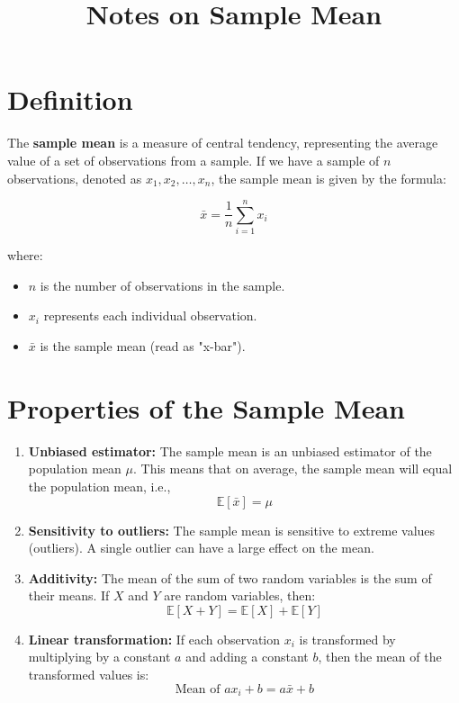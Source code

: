 \documentclass{article}
\title{Notes on Sample Mean}
\author{}
\date{}
\begin{document}
\maketitle

\section*{Definition}

The \textbf{sample mean} is a measure of central tendency, representing the average value of a set of observations from a sample. If we have a sample of $n$ observations, denoted as $x_1, x_2, \dots, x_n$, the sample mean is given by the formula:

\[
\bar{x} = \frac{1}{n} \sum_{i=1}^{n} x_i
\]

where:
\begin{itemize}
    \item $n$ is the number of observations in the sample.
    \item $x_i$ represents each individual observation.
    \item $\bar{x}$ is the sample mean (read as "x-bar").
\end{itemize}

\section*{Properties of the Sample Mean}

\begin{enumerate}
    \item \textbf{Unbiased estimator:} The sample mean is an unbiased estimator of the population mean $\mu$. This means that on average, the sample mean will equal the population mean, i.e.,
    \[
    \mathbb{E}[\bar{x}] = \mu
    \]
    
    \item \textbf{Sensitivity to outliers:} The sample mean is sensitive to extreme values (outliers). A single outlier can have a large effect on the mean.
    
    \item \textbf{Additivity:} The mean of the sum of two random variables is the sum of their means. If $X$ and $Y$ are random variables, then:
    \[
    \mathbb{E}[X + Y] = \mathbb{E}[X] + \mathbb{E}[Y]
    \]
    
    \item \textbf{Linear transformation:} If each observation $x_i$ is transformed by multiplying by a constant $a$ and adding a constant $b$, then the mean of the transformed values is:
    \[
    \text{Mean of } ax_i + b = a\bar{x} + b
    \]
\end{enumerate}
\end{document}
